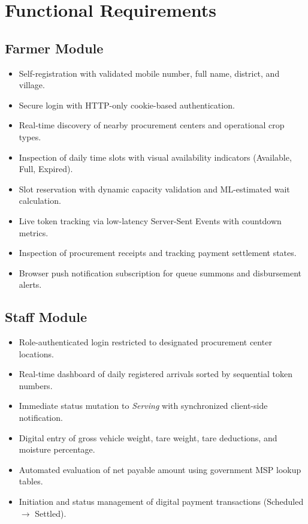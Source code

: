 \section{Functional Requirements}

\subsection{Farmer Module}
\begin{itemize}
  \item Self-registration with validated mobile number, full name, district, and village.
  \item Secure login with HTTP-only cookie-based authentication.
  \item Real-time discovery of nearby procurement centers and operational crop types.
  \item Inspection of daily time slots with visual availability indicators (Available, Full, Expired).
  \item Slot reservation with dynamic capacity validation and ML-estimated wait calculation.
  \item Live token tracking via low-latency Server-Sent Events with countdown metrics.
  \item Inspection of procurement receipts and tracking payment settlement states.
  \item Browser push notification subscription for queue summons and disbursement alerts.
\end{itemize}

\subsection{Staff Module}
\begin{itemize}
  \item Role-authenticated login restricted to designated procurement center locations.
  \item Real-time dashboard of daily registered arrivals sorted by sequential token numbers.
  \item Immediate status mutation to \textit{Serving} with synchronized client-side notification.
  \item Digital entry of gross vehicle weight, tare weight, tare deductions, and moisture percentage.
  \item Automated evaluation of net payable amount using government MSP lookup tables.
  \item Initiation and status management of digital payment transactions (Scheduled $\to$ Settled).
\end{itemize}

